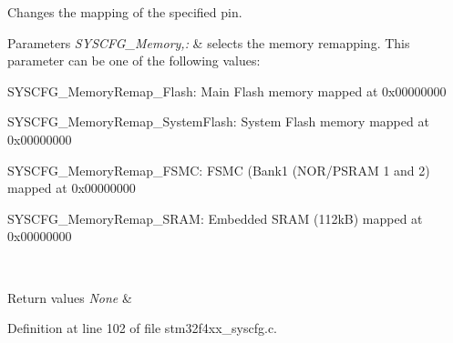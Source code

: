 Changes the mapping of the specified pin. 


\begin{DoxyParams}{Parameters}
{\em S\-Y\-S\-C\-F\-G\-\_\-\-Memory,\-:} & selects the memory remapping. This parameter can be one of the following values\-: \begin{DoxyItemize}
\item S\-Y\-S\-C\-F\-G\-\_\-\-Memory\-Remap\-\_\-\-Flash\-: Main Flash memory mapped at 0x00000000 \item S\-Y\-S\-C\-F\-G\-\_\-\-Memory\-Remap\-\_\-\-System\-Flash\-: System Flash memory mapped at 0x00000000 \item S\-Y\-S\-C\-F\-G\-\_\-\-Memory\-Remap\-\_\-\-F\-S\-M\-C\-: F\-S\-M\-C (Bank1 (N\-O\-R/\-P\-S\-R\-A\-M 1 and 2) mapped at 0x00000000 \item S\-Y\-S\-C\-F\-G\-\_\-\-Memory\-Remap\-\_\-\-S\-R\-A\-M\-: Embedded S\-R\-A\-M (112k\-B) mapped at 0x00000000 \end{DoxyItemize}
\\
\hline
\end{DoxyParams}

\begin{DoxyRetVals}{Return values}
{\em None} & \\
\hline
\end{DoxyRetVals}


Definition at line 102 of file stm32f4xx\-\_\-syscfg.\-c.

